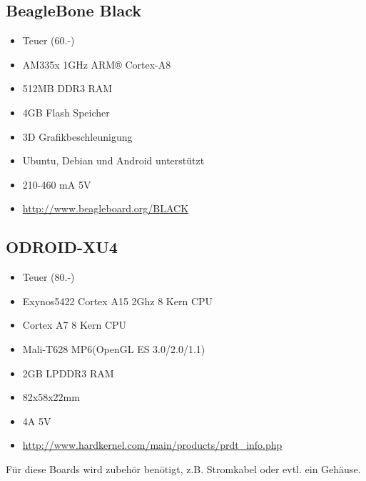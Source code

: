\subsection{BeagleBone Black}
\begin{itemize}
\item Teuer (60.-)
\item AM335x 1GHz ARM® Cortex-A8
\item 512MB DDR3 RAM
\item 4GB Flash Speicher
\item 3D Grafikbeschleunigung
\item Ubuntu, Debian und Android unterstützt
\item 210-460 mA 5V
\item \url{http://www.beagleboard.org/BLACK}
\end{itemize}

\subsection{ODROID-XU4}
\begin{itemize}
\item Teuer (80.-)
\item Exynos5422 Cortex A15 2Ghz 8 Kern CPU
\item Cortex A7 8 Kern CPU
\item Mali-T628 MP6(OpenGL ES 3.0/2.0/1.1)
\item 2GB LPDDR3 RAM
\item 82x58x22mm
\item 4A 5V
\item \url{http://www.hardkernel.com/main/products/prdt_info.php}
\end{itemize}

Für diese Boards wird zubehör benötigt, z.B. Stromkabel oder evtl. ein Gehäuse.

